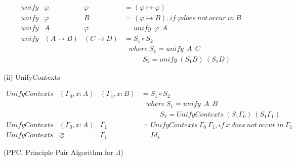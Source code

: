 \begin{equation*}
\begin{array}{llll}
unify & \varphi            & \varphi          & = (\varphi \mapsto \varphi)\\
unify & \varphi            & B                & = (\varphi \mapsto B), if\ \varphi does\ not\ occur\ in\ B\\
unify & A                  & \varphi          & = unify\ \ \varphi\ \ A\\
unify & (A\rightarrow B)   & (C\rightarrow D) & = S_1\circ S_2\\
&&&\ \ \ where\ S_1 = unify\ \ A\ \ C\\
&&&\ \ \ \ \ \ \ \ \ \ \ \ S_2 = unify\ (S_1B)\ (S_1D)
\end{array}
\end{equation*}


\noindent (ii) UnifyContexts

\begin{equation*}
\begin{array}{llll}
UnifyContexts & (\Gamma _0,x:A) & (\Gamma _1,x:B) & = S_1\circ S_2\\
&&&\ \ \ where\ S_1 = unify\ \ A\ \ B\\
&&&\ \ \ \ \ \ \ \ \ \ \ \ S_2 = UnifyContexts\ (S_1\Gamma _0)\ (S_1\Gamma _1)\\
UnifyContexts & (\Gamma _0,x:A) & \Gamma _1 & = UnifyContexts\ \Gamma _0\ \Gamma _1, if\ x\ does\ not\ occur\ in\ \Gamma _1\\
UnifyContexts & \varnothing & \Gamma _1 & =  Id_s
\end{array}
\end{equation*}



\begin{def1}
\normalfont (PPC, Principle Pair Algorithm for $\Lambda$)
\end{def1}

